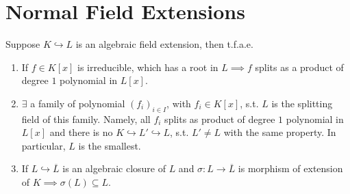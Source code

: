 \section{Normal Field Extensions}

\begin{proposition}
	Suppose \( K \hookrightarrow L \) is an algebraic field extension, then t.f.a.e.
	\begin{enumerate}
		\item If \( f \in K[x] \) is irreducible, which has a root in \( L \implies f \) splits as a
		      product of degree \( 1 \) polynomial in \( L[x] \).
		\item \( \exists \) a family of polynomial \( (f_i)_{i\in I} \), with \( f_i \in K[x] \), s.t. \( L \) is the
		      splitting field of this family. Namely, all \( f_i \) splits as product of degree \( 1 \)
		      polynomial in \( L[x] \) and there is no \( K \hookrightarrow L' \hookrightarrow L \), s.t. \(
		      L' \ne L \) with the same property. In particular, \( L \) is the smallest.
		\item If \( L \hookrightarrow \overline{L} \) is an algebraic closure of \( L \) and \( \sigma :
		      L \to \overline{L}\) is morphism of extension of \( K \implies \sigma(L) \subseteq L \).
	\end{enumerate}
\end{proposition}

